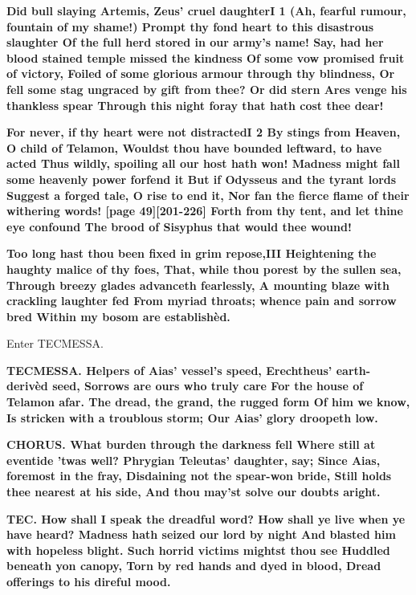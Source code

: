 \documentclass[11pt,letter]{book}
\begin{document}
\par \textbf{Did bull slaying Artemis, Zeus’ cruel daughterI 1 (Ah, fearful rumour, fountain of my shame!) Prompt thy fond heart to this disastrous slaughter Of the full herd stored in our army’s name! Say, had her blood stained temple missed the kindness Of some vow promised fruit of victory, Foiled of some glorious armour through thy blindness, Or fell some stag ungraced by gift from thee? Or did stern Ares venge his thankless spear Through this night foray that hath cost thee dear!}
\par 

\par \textbf{For never, if thy heart were not distractedI 2 By stings from Heaven, O child of Telamon, Wouldst thou have bounded leftward, to have acted Thus wildly, spoiling all our host hath won! Madness might fall some heavenly power forfend it But if Odysseus and the tyrant lords Suggest a forged tale, O rise to end it, Nor fan the fierce flame of their withering words! [page 49][201-226] Forth from thy tent, and let thine eye confound The brood of Sisyphus that would thee wound!}
\par 

\par \textbf{Too long hast thou been fixed in grim repose,III Heightening the haughty malice of thy foes, That, while thou porest by the sullen sea, Through breezy glades advanceth fearlessly, A mounting blaze with crackling laughter fed From myriad throats; whence pain and sorrow bred Within my bosom are establishèd.}
\par 

\par  Enter TECMESSA.

\par \textbf{TECMESSA. Helpers of Aias’ vessel’s speed, Erechtheus’ earth-derivèd seed, Sorrows are ours who truly care For the house of Telamon afar. The dread, the grand, the rugged form Of him we know, Is stricken with a troublous storm; Our Aias’ glory droopeth low.}
\par 

\par \textbf{CHORUS. What burden through the darkness fell Where still at eventide ’twas well? Phrygian Teleutas’ daughter, say; Since Aias, foremost in the fray, Disdaining not the spear-won bride, Still holds thee nearest at his side, And thou may’st solve our doubts aright.}
\par 

\par \textbf{TEC. How shall I speak the dreadful word? How shall ye live when ye have heard? Madness hath seized our lord by night And blasted him with hopeless blight. Such horrid victims mightst thou see Huddled beneath yon canopy, Torn by red hands and dyed in blood, Dread offerings to his direful mood.}
\par 
\end{document}
